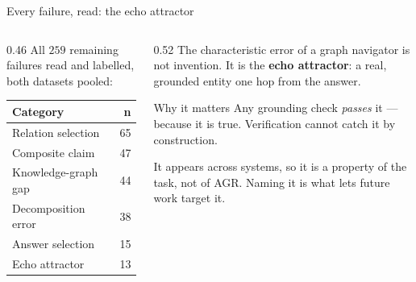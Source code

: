 \documentclass[aspectratio=169,12pt]{beamer}
\begin{document}
\begin{frame}{Every failure, read: the echo attractor}
  \begin{columns}[T]
    \begin{column}{0.46\textwidth}
      \small
      All $259$ remaining failures read and labelled, both datasets pooled:
      \vspace{1mm}
      \begin{tabular}{@{}lr@{}}
        \toprule
        \textbf{Category} & \textbf{n} \\
        \midrule
        Relation selection   & 65 \\
        Composite claim      & 47 \\
        Knowledge-graph gap  & 44 \\
        Decomposition error  & 38 \\
        Answer selection     & 15 \\
        \alert{Echo attractor} & \alert{13} \\
        \bottomrule
      \end{tabular}
    \end{column}
    \begin{column}{0.52\textwidth}
      \small
      The characteristic error of a graph navigator is \alert{not invention}.
      It is the \textbf{echo attractor}: a real, grounded entity one hop from
      the answer.

      \vspace{2mm}
      \begin{block}{Why it matters}
        \small
        Any grounding check \emph{passes} it --- because it is true. Verification
        cannot catch it by construction.
      \end{block}
      \vspace{1mm}
      {\small It appears across systems, so it is a property of the task, not
      of AGR. Naming it is what lets future work target it.}
    \end{column}
  \end{columns}
\end{frame}
\end{document}

